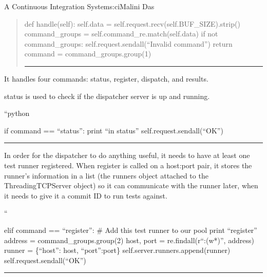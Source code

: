 \begin{aosachapter}{A Continuous Integration System}{s:ci}{Malini Das}
\begin{quote}
\begin{aosadescription}
\item[def handle(self):]
self.data = self.request.recv(self.BUF\_SIZE).strip() command\_groups =
self.command\_re.match(self.data) if not command\_groups:
self.request.sendall(``Invalid command'') return command =
command\_groups.group(1)
\end{aosadescription}

\begin{center}\rule{3in}{0.4pt}\end{center}
\end{quote}

It handles four commands: status, register, dispatch, and results.

status is used to check if the dispatcher server is up and running.

\begin{aosadescription}
\item[``python]
\begin{aosadescription}

\item[if command == ``status'':]
print ``in status'' self.request.sendall(``OK'')
\end{aosadescription}
\end{aosadescription}

\begin{center}\rule{3in}{0.4pt}\end{center}

In order for the dispatcher to do anything useful, it needs to have at
least one test runner registered. When register is called on a host:port
pair, it stores the runner's information in a list (the runners object
attached to the ThreadingTCPServer object) so it can communicate with
the runner later, when it needs to give it a commit ID to run tests
against.

\begin{aosadescription}
\item[``]
\begin{aosadescription}

\item[elif command == ``register'':]
\# Add this test runner to our pool print ``register'' address =
command\_groups.group(2) host, port = re.findall(r``:(w*)'', address)
runner = \{``host'': host, ``port'':port\}
self.server.runners.append(runner) self.request.sendall(``OK'')
\end{aosadescription}
\end{aosadescription}

\begin{center}\rule{3in}{0.4pt}\end{center}


\end{aosachapter}
